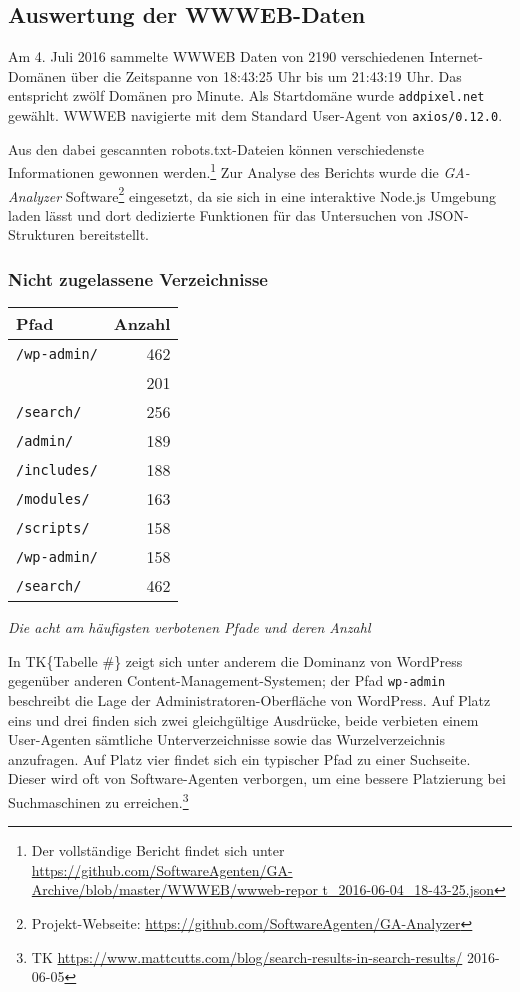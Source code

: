 \subsection{Auswertung der WWWEB-Daten}
\label{sub:auswertung-der-wwweb-daten}

Am 4. Juli 2016 sammelte WWWEB Daten von 2190 verschiedenen Internet-Domänen
über die Zeitspanne von 18:43:25 Uhr bis um 21:43:19 Uhr. Das entspricht zwölf
Domänen pro Minute. Als Startdomäne wurde \texttt{addpixel.net} gewählt. WWWEB
navigierte mit dem Standard User-Agent von \texttt{axios/0.12.0}.

Aus den dabei gescannten robots.txt-Dateien können verschiedenste Informationen
gewonnen werden.\footnote{Der vollständige Bericht findet sich unter
\url{https://github.com/SoftwareAgenten/GA-Archive/blob/master/WWWEB/wwweb-repor
t_2016-06-04_18-43-25.json}} Zur Analyse des Berichts wurde die
\emph{GA-Analyzer} Software\footnote{Projekt-Webseite:
\url{https://github.com/SoftwareAgenten/GA-Analyzer}} eingesetzt, da sie sich
in eine interaktive Node.js Umgebung laden lässt und dort dedizierte Funktionen
für das Untersuchen von JSON-Strukturen bereitstellt.

\subsubsection{Nicht zugelassene Verzeichnisse}
\label{ssub:nicht-zugelassene-verzeichnisse}

\begin{tabular}{ l|r }
  \textbf{Pfad} & \textbf{Anzahl}\\
  \hline
  \texttt{/wp-admin/} & 462\\
                      & 201\\
  \texttt{/search/}   & 256\\
  \texttt{/admin/}    & 189\\
  \texttt{/includes/} & 188\\
  \texttt{/modules/}  & 163\\
  \texttt{/scripts/}  & 158\\
  \texttt{/wp-admin/} & 158\\
  \texttt{/search/}   & 462\\
\end{tabular}

\emph{Die acht am häufigsten verbotenen Pfade und deren Anzahl}

In TK\{Tabelle \#\} zeigt sich unter anderem die Dominanz von WordPress
gegenüber anderen Content-Management-Systemen; der Pfad \texttt{wp-admin}
beschreibt die Lage der Administratoren-Oberfläche von WordPress. Auf Platz
eins und drei finden sich zwei gleichgültige Ausdrücke, beide verbieten einem
User-Agenten sämtliche Unterverzeichnisse sowie das Wurzelverzeichnis
anzufragen. Auf Platz vier findet sich ein typischer Pfad zu einer Suchseite.
Dieser wird oft von Software-Agenten verborgen, um eine bessere Platzierung bei
Suchmaschinen zu erreichen.\footnote{TK
\url{https://www.mattcutts.com/blog/search-results-in-search-results/}
2016-06-05}

